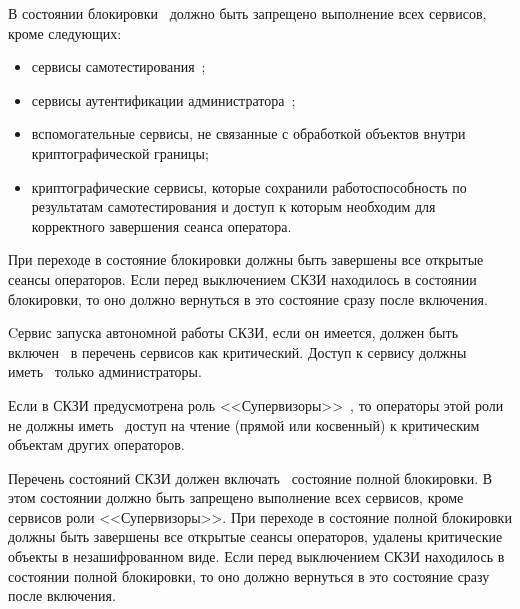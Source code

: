 \label{R.AC.LockState} %
В состоянии блокировки~ должно быть запрещено выполнение 
всех сервисов, кроме следующих:
\begin{itemize}
\item
сервисы самотестирования~;
\item
сервисы аутентификации администратора~;
\item
вспомогательные сервисы, не связанные с обработкой объектов внутри 
криптографической границы;
\item
криптографические сервисы, которые сохранили работоспособность по 
результатам самотестирования и доступ к которым необходим для корректного
завершения сеанса оператора.
\end{itemize}
%
При переходе в состояние блокировки должны быть завершены все открытые сеансы 
операторов.
%
Если перед выключением СКЗИ находилось в состоянии блокировки, то оно должно
вернуться в это состояние сразу после включения.

\label{R.AC.Auto} %
Cервис запуска автономной работы СКЗИ, если он имеется, 
должен быть включен~ в перечень сервисов как критический.
Доступ к сервису должны иметь~ только администраторы.

\label{R.AC.DevRole} %
Если в СКЗИ предусмотрена роль <<Супервизоры>>~,
то операторы этой роли не должны иметь~ доступ 
на чтение (прямой или косвенный) к критическим объектам других операторов.

\label{R.AC.CrashState} %
Перечень состояний СКЗИ должен включать~ состояние полной 
блокировки. 
%
В этом состоянии должно быть запрещено выполнение всех сервисов, кроме 
сервисов роли <<Супервизоры>>.
%
При переходе в состояние полной блокировки должны быть завершены 
все открытые сеансы операторов, удалены критические объекты в незашифрованном 
виде.
%
Если перед выключением СКЗИ находилось в состоянии полной блокировки, то оно
должно вернуться в это состояние сразу после включения.


